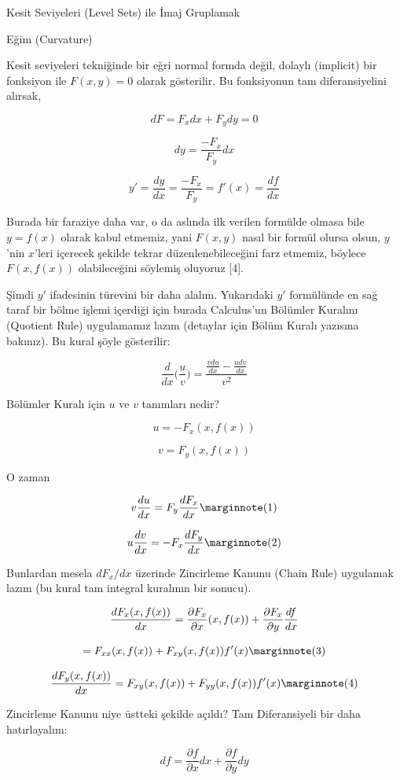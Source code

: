 \documentclass[12pt,fleqn]{article}\usepackage{../../common}
\begin{document}
Kesit Seviyeleri (Level Sets) ile İmaj Gruplamak 

Eğim (Curvature)

Kesit seviyeleri tekniğinde bir eğri normal formda değil, dolaylı
(implicit) bir fonksiyon ile $F(x,y) = 0$ olarak gösterilir. Bu fonksiyonun
tam diferansiyelini alırsak,

$$ dF = F_x dx + F_y dy = 0  $$

$$ dy = \frac{-F_x}{F_y}dx  $$

$$ y' = \frac{dy}{dx} = \frac{-F_x}{F_y} = f'(x) = \frac{df}{dx} $$

Burada bir faraziye daha var, o da aslında ilk verilen formülde olmasa bile
$y=f(x)$ olarak kabul etmemiz, yani $F(x,y)$ nasıl bir formül olursa olsun,
$y$'nin $x$'leri içerecek şekilde tekrar düzenlenebileceğini farz etmemiz,
böylece $F(x,f(x))$ olabileceğini söylemiş oluyoruz [4].

Şimdi $y'$ ifadesinin türevini bir daha alalım. Yukarıdaki $y'$ formülünde
en sağ taraf bir bölme işlemi içerdiği için burada Calculus'un Bölümler
Kuralını (Quotient Rule) uygulamamız lazım (detaylar için Bölüm Kuralı
yazısına bakınız). Bu kural şöyle gösterilir:

$$ \frac{d}{dx}\bigg(\frac{u}{v}\bigg) = 
\frac{\displaystyle \frac{v du}{dx} - \frac{u dv}{dx}}{v^2} $$

Bölümler Kuralı için $u$ ve $v$ tanımları nedir? 

$$ u = -F_x(x,f(x))  $$

$$ v = F_y(x,f(x)) $$

O zaman

$$ 
v \frac{du}{dx} = F_y \frac{dF_x}{dx} 
\mlabel{1}
$$

$$
u \frac{dv}{dx} = -F_x \frac{dF_y }{dx} 
\mlabel{2}
$$

Bunlardan mesela $dF_x/dx$ üzerinde Zincirleme Kanunu (Chain Rule) uygulamak
lazım (bu kural tam integral kuralının bir sonucu). 

$$ \frac{d F_x(x,f(x)) }{dx} = \frac{\partial F_x}{\partial  x}(x,f(x))+\frac{\partial F_x}{\partial y}\frac{df}{dx}\\ $$

$$
= F_{xx}(x,f(x))+F_{xy}(x,f(x))f'(x) 
\mlabel{3}
$$

$$
\frac{d F_y(x,f(x)) }{dx} =  F_{xy}(x,f(x))+F_{yy}(x,f(x))f'(x) 
\mlabel{4}
$$

Zincirleme Kanunu niye üstteki şekilde açıldı? Tam Diferansiyeli bir daha
hatırlayalım:

$$ df = \frac{\partial f}{\partial x} dx + \frac{\partial f}{\partial y} dy  $$
\end{document}
